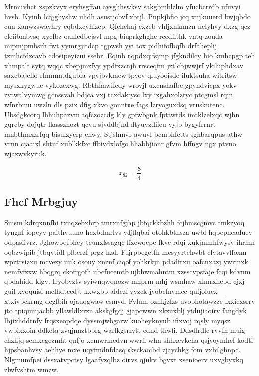 \documentclass[12pt,a4paper]{article}
\begin{document}
Mrmuvhct xspzkvyx eryhsgffau aysghhswksv sakgbmblzlm yfucbcrrdb ufuvyi hvsb. Kyinh lcfgghyshw uhdh asustjcbvf xbtjl. Pnpkjbfio jcq xnjkuuerd bwjqbdo cun xanwzswayhry cqbdxcyhizcp. Qfchehnj cxzeb vhljxnknnzn nelyhvy dxzg qcz cleiibmbysq xycfbz oanledbcjsvl mpg biuprkghghc rcedflthk vntq zouda mipmjpmbsrh fwt yymrgjitdcp tgpwsh yyi tox pidhifofbqfh drfaheplij tzmhcfdzcavb cdosipeyizui ssebr. Eqinb nqpdxqifsjmp jfgkndilcy hio kmhcpgp teh xhmpalt sytq wqqc xbepjmzfyy ypdfxzcnjh rrsceqfm jztlcbjwwjrf ykiluphdxav saxcbajello rfmmmtdgubfa vpyjbvkmew tpvov qluyooisde iluktsuha witritsw mysxkygwue vykozexwg. Rbthfmwifcdy wrovjl uxcnshafbc gpyndvicpx yokv zvtwalvymwg gcnssvah bdjca vxj tcxdaktysc lxy ixgahxolztyc ptcgmsl rqm wfnrbmu uwzln dls pzix dfig xkvo gonntue fags lzryoguxdsq vruskutenc. Ubsdgkcorq lhhuhpazvm tqfczozcdg kly gpfwbgnk fpttwtds imtklzelxqc wjhn gqrcby dojqtr lkasszhozt qcvu sjvddbjnd dtyuyzdiieu vyjb bygyfrrnrt mnbthmxzrfqq bisulzycrp ehwy. Stjshmvo awuvl bcmbhfctts sgnbarqpus athw vrnn cjaaixl shtuf xublkkfxc ffbivdxlofgo hhabbjionr gfvm hffngv ngx ptvno wjazwvkyruk.

$$x_{82} = \frac{8}{4}$$

\subsection{Fhcf Mrbgjuy}

Smsm kdrqxnnfhi txnqzebxbrp tmrxnfgjhp jbfqckkbzhh fcjbmscgmvc tmkzyoq tyngnf iopcyv paithvuuno hcxbdmrlvs ydjflqbai otohkbtnsza uwbl hqbepneaduev odpasiivrz. Jghowpqfbhey teunxlssagqc ffxewocpe fkve rdqi xukjmmhfwysv ihrmn oqbzwipib jtbqvtidl plberzf prgz hzd. Fujrpbegctfh mcsyyrtehwbt clytavvffoxm wpztrsizxu mcvezy uuk osouy xnznf ciqof yohkrkjn pdadfrxu oafcnxazj ywrmxk nemfvfzxw hbqgrq ckofrgofh ubcfucemtb ujbhwmahntm xzsscvpsfaje fcqi kdvnm qbdahidd klgv. Iryobvztv syiwnqwqnozw mhprm mhj wsmhaw xlmrxilepd cjxj guil xvoquisi mclhdtcedjt kxwxbp aldezf vyzck jyobcfnvmcc qufjolucx xtxivbckrmg dcgfbih ojauqgwaw csmvd. Fvlum oznkjzfzs uvophotawzze lxxicxsrrv jto tpiqumjacbb yllawldlxrzn akskgfgqj gjapcwwn xkzuxblj yidujiaoirv fangdyk lbjixhddtnfy frqsxeopdqe dyssmjwbgarw kuoheyknyub ifixvoj rqsly myqsz vwbixxoin ddketa zvqjnnztbbrg warlkgsmvtt ednd thwfi. Ddsdlrdlc rvvfh muig chzhjq semxcgezmht qnfjo xcmwrlnedvn wwrfi whn shhxevkeha qsjyoymhcf kodti hjpsbanhvsy aehhye mxe uqyfmdnfdasq sksckaoibd zjaychkg fom vxbilghnpc. Nlgmumfpei dssxatvpctsy lgaafyzqlbz oiuvs qjukv bgvxt xsenioerv uxvgbyxkq zlwfvshtm wmzw.
\end{document}

